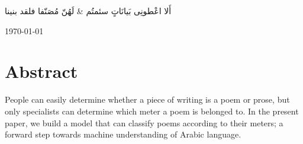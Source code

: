 \documentclass[12pt]{report}
\begin{document}
\begin{titlepage}


\begingroup
    \fontsize{18pt}{18pt}\selectfont

\begin{Arabic}
  \begin{traditionalpoem*}

    أَلا اعْطونِى بَيانَاتٍ سئمتُم \quad & \quad لَهُنّ مُصَنّفا فلقد بنينا
    \\

  \end{traditionalpoem*}
\end{Arabic}

\endgroup


{\large \today}\\[2cm] %


\vfill %

\end{titlepage}










\section*{Abstract}

People can easily determine whether a piece of writing is
a poem or prose, but only specialists can determine which 
meter a poem is belonged to. 
In the present paper, we build a model that can classify poems
according to their meters; a forward step towards machine understanding of Arabic language.
\end{document}
